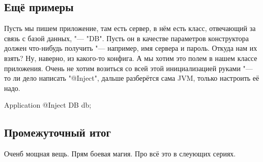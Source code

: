 \subsection{Ещё примеры}
Пусть мы пишем приложение, там есть сервер, в нём есть класс, отвечающий за связь с базой данных, "--- \java"DB".
Пусть он в качестве параметров конструктора должен что-нибудь получить "--- например, имя сервера и пароль.
Откуда нам их взять? 
Ну, наверно, из какого-то конфига.
А мы хотим это полем в нашем классе приложения.
Очень не хотим возиться со всей этой инициализацией руками "--- то ли дело написать \java"@Inject", 
дальше разберётся сама JVM, только настроить её надо.
\begin{javacode}
Application {
	@Inject
	DB db;
}
\end{javacode}

\subsection{Промежуточный итог}
Оченб мощная вещь. Прям боевая магия. Про всё это в слеующих сериях.

